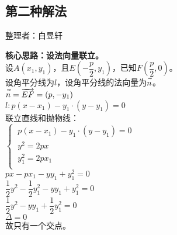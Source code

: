 \documentclass[UTF8]{ctexart}
\let\nvec\vec
\def\vec#1{\nvec{\vphantom b\smash{#1}}}
\begin{document}
\newpage

\subsection{第二种解法}
    \begin{center}
        整理者：白昱轩
    \end{center}
    \begin{multicols}{2}
        \small
        \textbf{核心思路：设法向量联立。}\\[5mm]
        设$A(x_1,y_1)$，且$E\left(-\dfrac{p}{2},y_1\right)$，已知$F\left(\dfrac{p}{2},0\right)$。\\[5mm]
        设角平分线为$l$，设角平分线的法向量为$\vec{n}$。\\[5mm]
        $\vec{n} = \overrightarrow{EF} = \left(p,-y_1\right)$\\[5mm]
        $l:p\left(x-x_1\right)-y_1\cdot\left(y-y_1\right) = 0$\\[5mm]
        联立直线和抛物线：\\[5mm]
        \begin{math}
            \begin{cases}
                ~p\left(x-x_1\right)-y_1\cdot\left(y-y_1\right) = 0\\[1mm]
                ~y^2 = 2px\\[1mm]
                ~y_1^2 = 2px_1\\[1mm]
            \end{cases}
        \end{math}\\[5mm]
        $px-px_1-yy_1+y_1^2 = 0$\\[5mm]
        $\dfrac{1}{2}y^2-\dfrac{1}{2}y_1^2-yy_1+y_1^2 = 0$\\[5mm]
        $\dfrac{1}{2}y^2-yy_1+\dfrac{1}{2}y_1^2=0$\\[5mm]
        $\Delta=0$\\[5mm]
        故只有一个交点。
        \newpage
    \end{multicols}   

\newpage
\end{document}
